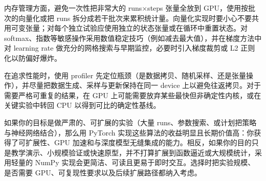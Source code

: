 \documentclass[11pt]{ctexart}
\begin{document}
内存管理方面，避免一次性把非常大的 runs×steps 张量全放到
GPU，使用按批次的向量化或把 runs
拆分成若干批次来累积统计量。向量化实现时要小心不要共用可变张量；对每个独立试验应使用独立的状态张量或在循环中重置状态。对
softmax、指数等敏感操作采用数值稳定技巧（例如减去最大值），并在梯度方法中对
learning rate 做充分的网格搜索与早期监控，必要时引入梯度裁剪或 L2
正则化以防偏好爆炸。

在追求性能时，使用 profiler
先定位瓶颈（是数据拷贝、随机采样、还是张量操作），并尽量把数据生成、采样与更新保持在同一
device 上以避免往返拷贝。对于需要严格可重复的结果，在 GPU
上可能需要放弃某些最快但非确定性内核，或在关键实验中转回 CPU
以得到可比的确定性基线。

如果你的目标是做严肃的、可扩展的实验（大量
runs、参数搜索、或计划把策略与神经网络结合），那么用 PyTorch
实现这些算法的收益明显且长期价值高：你获得了可扩展性、GPU
加速和与深度模型无缝集成的能力。相反，如果你的目的只是教学演示、小规模验证或快速原型，并不打算扩展到函数逼近或大规模统计，采用轻量的
NumPy 实现会更简洁、可读且更易于即时交互。选择时把实验规模、是否需要
GPU、可复现性要求以及后续扩展路径都纳入考虑。
\end{document}
